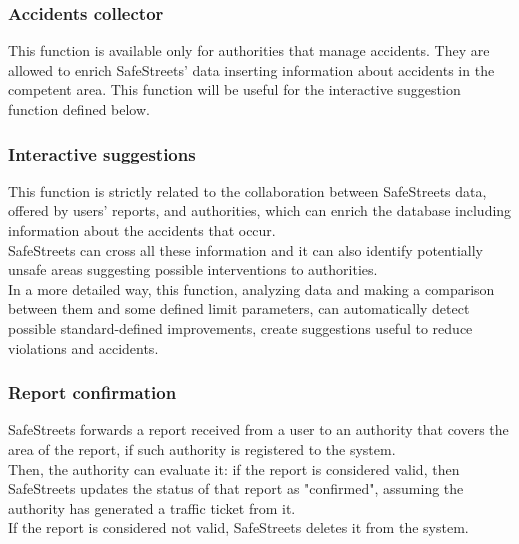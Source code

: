 \documentclass{article}
\begin{document}
			\subsubsection{Accidents collector}
				This function is available only for authorities that manage accidents. They are allowed to enrich SafeStreets' data inserting information about accidents in the competent area. This function will be useful for the interactive suggestion function defined below. 
			
			\subsubsection{Interactive suggestions}
				This function is strictly related to the collaboration between SafeStreets data, offered by users' reports, and authorities, which can enrich the database including information about the accidents that occur. \\SafeStreets can cross all these information and it can also identify potentially unsafe areas suggesting possible interventions to authorities. \\
				In a more detailed way, this function, analyzing data and making a comparison between them and some defined limit parameters, can automatically detect possible standard-defined improvements, create suggestions useful to reduce violations and accidents.
				
			\subsubsection{Report confirmation}
				SafeStreets forwards a report received from a user to an authority that covers the area of the report, if such authority is registered to the system.\\
				Then, the authority can evaluate it: if the report is considered valid, then SafeStreets updates the status of that report as "confirmed", assuming the authority has generated a traffic ticket from it.\\
				If the report is considered not valid, SafeStreets deletes it from the system.\\
				
\end{document}
